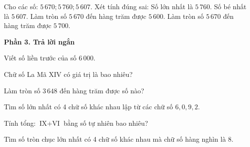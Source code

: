 \begin{ex} %
Cho các số: $5\,670; 5\,760; 5\,607$. Xét tính đúng sai:
\choiceTF
{\True Số lớn nhất là $5\,760$.}
{\True Số bé nhất là $5\,607$.}
{Làm tròn số $5\,670$ đến hàng trăm được $5\,600$.}
{\True Làm tròn số $5\,670$ đến hàng trăm được $5\,700$.}
\end{ex}

\textbf{Phần 3. Trả lời ngắn}

\begin{ex} %
Viết số liền trước của số $6\,000$.
\end{ex}

\begin{ex} %
Chữ số La Mã $\text{XIV}$ có giá trị là bao nhiêu?
\end{ex}

\begin{ex} %
Làm tròn số $3\,648$ đến hàng trăm được số nào?
\end{ex}

\begin{ex} %
Tìm số lớn nhất có 4 chữ số khác nhau lập từ các chữ số $6, 0, 9, 2$.
\end{ex}

\begin{ex} %
Tính tổng: $\text{IX} + \text{VI}$ bằng số tự nhiên bao nhiêu?
\end{ex}

\begin{ex} %
Tìm số tròn chục lớn nhất có 4 chữ số khác nhau mà chữ số hàng nghìn là 8.
\end{ex}
